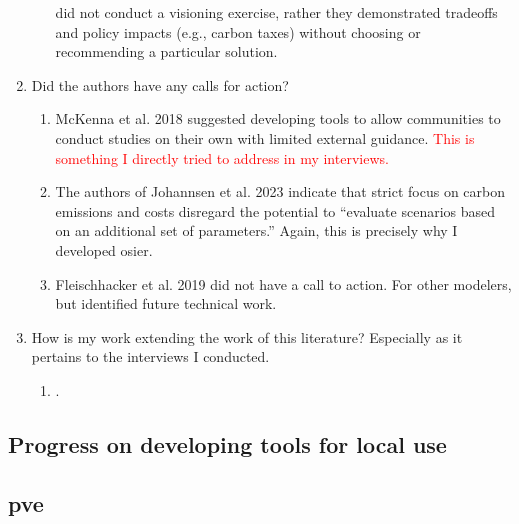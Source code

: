 \begin{enumerate}
\begin{enumerate}
        \cite{fleischhacker_portfolio_2019} did not conduct a visioning
        exercise, rather they demonstrated tradeoffs and policy impacts (e.g.,
        carbon taxes) without choosing or recommending a particular solution.
    \end{enumerate}
    \item Did the authors have any calls for action?
    \begin{enumerate}
        \item McKenna et al. 2018 \cite{mckenna_combining_2018} suggested
        developing tools to allow communities to conduct studies on their own
        with limited external guidance. \textcolor{red}{This is something I
        directly tried to address in my interviews.}
        \item The authors of Johannsen et al. 2023
        \cite{johannsen_municipal_2023} indicate that strict focus on carbon
        emissions and costs disregard the potential to ``evaluate scenarios
        based on an additional set of parameters.'' Again, this is precisely why
        I developed \ac{osier}.
        \item Fleischhacker et al. 2019 \cite{fleischhacker_portfolio_2019} did
        not have a call to action. For other modelers, but identified future
        technical work.
    \end{enumerate}
    \item How is my work extending the work of this literature? Especially as it
    pertains to the interviews I conducted.
    \begin{enumerate}
        \item .
    \end{enumerate}
\end{enumerate}

\subsection{Progress on developing tools for local use}

\subsection{\Acl{pve}}

